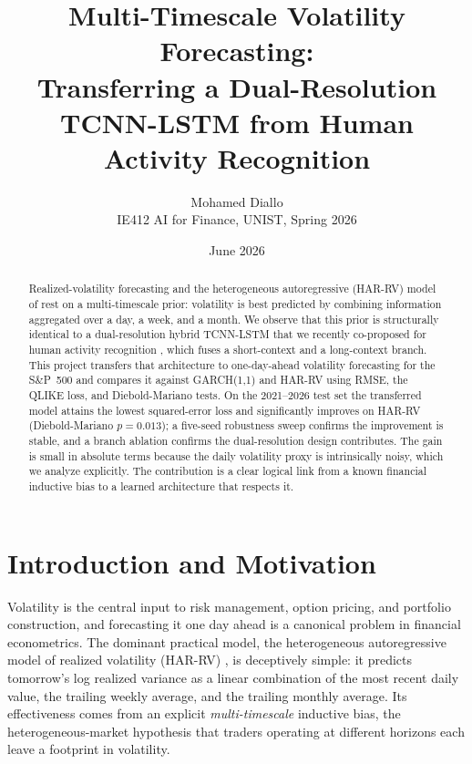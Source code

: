 \documentclass[11pt]{article}
\title{\vspace{-1.5em}Multi-Timescale Volatility Forecasting:\\
Transferring a Dual-Resolution TCNN-LSTM from Human Activity Recognition}
\author{Mohamed Diallo\\
\small IE412 AI for Finance, UNIST, Spring 2026}
\date{June 2026}
\begin{document}
\maketitle

\begin{abstract}
\noindent
Realized-volatility forecasting and the heterogeneous autoregressive (HAR-RV) model of
\citet{corsi2009} rest on a multi-timescale prior: volatility is best predicted by combining
information aggregated over a day, a week, and a month. We observe that this prior is
structurally identical to a dual-resolution hybrid TCNN-LSTM that we recently co-proposed for
human activity recognition \citep{warnants2026}, which fuses a short-context and a long-context
branch. This project transfers that architecture to one-day-ahead volatility forecasting for the
S\&P~500 and compares it against GARCH(1,1) and HAR-RV using RMSE, the QLIKE loss, and
Diebold-Mariano tests. On the 2021--2026 test set the transferred model attains the lowest
squared-error loss and significantly improves on HAR-RV (Diebold-Mariano $p=0.013$); a five-seed
robustness sweep confirms the improvement is stable, and a branch ablation confirms the
dual-resolution design contributes. The gain is small in absolute terms because the daily
volatility proxy is intrinsically noisy, which we analyze explicitly. The contribution is a clear
logical link from a known financial inductive bias to a learned architecture that respects it.
\end{abstract}

\section{Introduction and Motivation}
Volatility is the central input to risk management, option pricing, and portfolio construction,
and forecasting it one day ahead is a canonical problem in financial econometrics. The dominant
practical model, the heterogeneous autoregressive model of realized volatility (HAR-RV)
\citep{corsi2009}, is deceptively simple: it predicts tomorrow's log realized variance as a linear
combination of the most recent daily value, the trailing weekly average, and the trailing monthly
average. Its effectiveness comes from an explicit \emph{multi-timescale} inductive bias, the
heterogeneous-market hypothesis that traders operating at different horizons each leave a footprint
in volatility.
\end{document}
